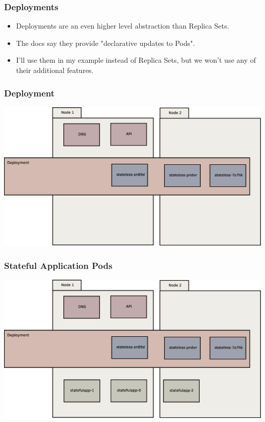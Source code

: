 \documentclass{beamer}
\begin{document}
\begin{frame}
    \frametitle{Deployments}
    \begin{itemize}
        \item Deployments are an even higher level abstraction than Replica Sets.
        \item The docs say they provide "declarative updates to Pods".
        \item I'll use them in my example instead of Replica Sets, but we won't use any of their additional features.
    \end{itemize}
\end{frame}

\begin{frame}
    \frametitle{Deployment}
    \includegraphics[width=\textwidth,height=\textheight,keepaspectratio]{graphics/03-deployment.eps}
\end{frame}

\begin{frame}
    \frametitle{Stateful Application Pods}
    \includegraphics[width=\textwidth,height=\textheight,keepaspectratio]{graphics/04-statefulAppPods.eps}
\end{frame}
\end{document}
